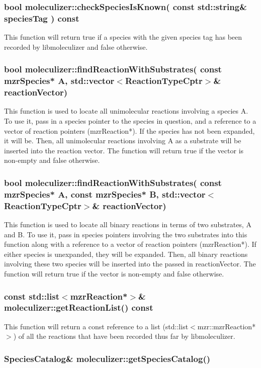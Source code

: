 \subsubsection{bool moleculizer::checkSpeciesIsKnown( const
  std::string\& speciesTag ) const}
This function will return true if a species with the given species tag
has been recorded by libmoleculizer and false otherwise.

\subsubsection{bool moleculizer::findReactionWithSubstrates(
  const mzrSpecies* A, std::vector$<$ReactionTypeCptr$>$\& reactionVector)}
This function is used to locate all unimolecular reactions involving a
species A.  To use it, pass in a species pointer to the species in
question, and a reference to a vector of reaction pointers
(mzrReaction*).  If the species has not been expanded, it will be.
Then, all unimolecular reactions involving A as a substrate will be
inserted into the reaction vector.  The function will return true if
the vector is non-empty and false otherwise.

\subsubsection{bool moleculizer::findReactionWithSubstrates(
  const mzrSpecies* A, const mzrSpecies* B,
  std::vector$<$ReactionTypeCptr$>$\& reactionVector)}
This function is used to locate all binary reactions in terms of two
substrates, A and B.  To use it, pass in species pointers involving
the two substrates into this function along with a reference to a
vector of reaction pointers (mzrReaction*).  If either species is
unexpanded, they will be expanded.  Then, all binary reactions
involving these two species will be inserted into the passed in
reactionVector.  The function will return true if the vector is
non-empty and false otherwise.

\subsubsection{const std::list$<$mzrReaction*$>$\& moleculizer::getReactionList()
  const}
This function will return a const reference to a list
(std::list$<$mzr::mzrReaction*$>$) of all the reactions that have been
recorded thus far by libmoleculizer. 

\subsubsection{SpeciesCatalog\& moleculizer::getSpeciesCatalog()}
